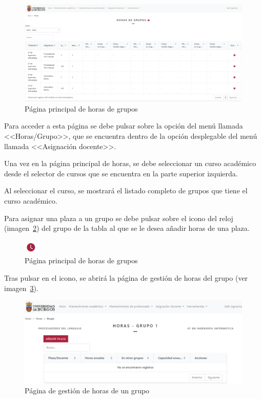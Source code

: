 \begin{figure}
	\centering
	\includegraphics[width=\textwidth]{../img/Anexos/Manual usuario/horas.png}
	\caption{Página principal de horas de grupos}\label{pag:horas}
\end{figure}

Para acceder a esta página se debe pulsar sobre la opción del menú llamada <<Horas/Grupo>>, que se encuentra dentro de la opción desplegable del menú llamada <<Asignación docente>>.

Una vez en la página principal de horas, se debe seleccionar un curso académico desde el selector de cursos que se encuentra en la parte superior izquierda.

Al seleccionar el curso, se mostrará el listado completo de grupos que tiene el curso académico.

Para asignar una plaza a un grupo se debe pulsar sobre el icono del reloj (imagen~\ref{pag:icnHoras}) del grupo de la tabla al que se le desea añadir horas de una plaza.

\begin{figure}
	\centering
	\includegraphics[width=.07\textwidth]{../img/Anexos/Manual usuario/icnHoras.png}
	\caption{Página principal de horas de grupos}\label{pag:icnHoras}
\end{figure}

Tras pulsar en el icono, se abrirá la página de gestión de horas del grupo (ver imagen~\ref{pag:horasGrupo}).

\begin{figure}
	\centering
	\includegraphics[width=\textwidth]{../img/Anexos/Manual usuario/horasGrupo.png}
	\caption{Página de gestión de horas de un grupo}\label{pag:horasGrupo}
\end{figure}

